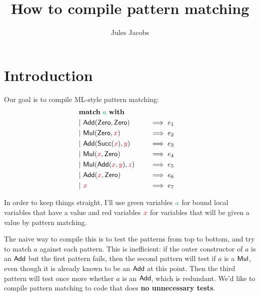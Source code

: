 \documentclass[a4paper, 11pt]{article}
\title{How to compile pattern matching}
\author{Jules Jacobs}
\theoremstyle{definition}
\begin{document}
\maketitle



\newcommand{\matchwith}[1]{&\mathbf{match}\ #1\ \mathbf{with}}
\newcommand{\clause}[2]{&\mathbf{\mid}\ #1\quad &&\implies #2 &}
\newcommand{\multimatch}{&\mathbf{multimatch}}
\newcommand{\constr}[1]{\mathsf{\textcolor{black}{#1}}}
\newcommand{\Add}{\constr{Add}}
\newcommand{\Mul}{\constr{Mul}}
\newcommand{\Zero}{\constr{Zero}}
\newcommand{\Succ}{\constr{Succ}}
\newcommand{\Var}{\constr{Var}}
\newcommand{\pat}{\mathcal{P}}
\newcommand{\C}{\constr{C}}
\newcommand{\fvar}[1]{\textcolor{red}{#1}}
\newcommand{\bvar}[1]{\textcolor{Green}{#1}}
\newcommand{\ba}{\bvar{a}}
\newcommand{\lett}[2]{\mathsf{let}\ #1 = #2\ \mathsf{in}\ }


\section{Introduction}

Our goal is to compile ML-style pattern matching:
\begin{alignat*}{4}
  \matchwith{\ba} \\
  \clause{\Add(\Zero, \Zero)}{e_1} \\
  \clause{\Mul(\Zero, \fvar{x})}{e_2} \\
  \clause{\Add(\Succ(\fvar x), \fvar y)}{e_3} \\
  \clause{\Mul(\fvar x, \Zero)}{e_4} \\
  \clause{\Mul(\Add(\fvar x, \fvar y), \fvar z)}{e_5} \\
  \clause{\Add(\fvar x, \Zero)}{e_6} \\
  \clause{\fvar x}{e_7} \\
\end{alignat*}

In order to keep things straight, I'll use green variables $\ba$ for bound local variables that have a value and red variables $\fvar{x}$ for variables that will be given a value by pattern matching.

The naive way to compile this is to test the patterns from top to bottom, and try to match $a$ against each pattern. This is inefficient: if the outer constructor of $a$ is an $\Add$ but the first pattern fails, then the second pattern will test if $a$ is a $\Mul$, even though it is already known to be an $\Add$ at this point. Then the third pattern will test once more whether $a$ is an $\Add$, which is redundant. We'd like to compile pattern matching to code that does \textbf{no unnecessary tests}.
\end{document}
